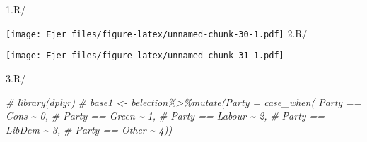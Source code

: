 \documentclass[
]{article}
\newenvironment{Shaded}{\begin{snugshade}}{\end{snugshade}}
\newcommand{\CommentTok}[1]{\textcolor[rgb]{0.56,0.35,0.01}{\textit{#1}}}
\newcommand{\FunctionTok}[1]{\textcolor[rgb]{0.00,0.00,0.00}{#1}}
\newcommand{\NormalTok}[1]{#1}
\newcommand{\SpecialCharTok}[1]{\textcolor[rgb]{0.00,0.00,0.00}{#1}}
\begin{document}
1.R/

\begin{Shaded}
\end{Shaded}

\texttt{[image: Ejer\_files/figure-latex/unnamed-chunk-30-1.pdf]} 2.R/

\begin{Shaded}
\end{Shaded}

\texttt{[image: Ejer\_files/figure-latex/unnamed-chunk-31-1.pdf]}

3.R/

\begin{Shaded}
\begin{Highlighting}[]
\CommentTok{\# library(dplyr)}
\CommentTok{\# base1 \textless{}{-} belection\%\textgreater{}\%mutate(Party  = case\_when( Party == \textquotesingle{}Cons\textquotesingle{} \textasciitilde{} 0,}
\CommentTok{\#                                                  Party == \textquotesingle{}Green\textquotesingle{} \textasciitilde{} 1,}
\CommentTok{\#                                                  Party == \textquotesingle{}Labour\textquotesingle{} \textasciitilde{} 2,}
\CommentTok{\#                                                  Party == \textquotesingle{}LibDem\textquotesingle{} \textasciitilde{} 3,}
\CommentTok{\#                                                  Party == \textquotesingle{}Other\textquotesingle{} \textasciitilde{} 4))}
\end{Highlighting}
\end{Shaded}
\end{document}
